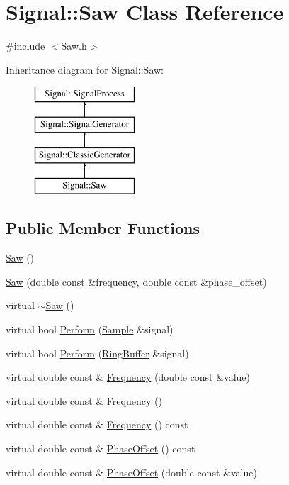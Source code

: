 \hypertarget{class_signal_1_1_saw}{\section{Signal\+:\+:Saw Class Reference}
\label{class_signal_1_1_saw}
}


{\ttfamily \#include $<$Saw.\+h$>$}

Inheritance diagram for Signal\+:\+:Saw\+:\begin{figure}[H]
\begin{center}
\leavevmode
\includegraphics[height=4.000000cm]{class_signal_1_1_saw}
\end{center}
\end{figure}
\subsection*{Public Member Functions}
\begin{DoxyCompactItemize}
\item 
\hyperlink{class_signal_1_1_saw_a4bce6f687d2bd26aa3c2fb209de4c9f9}{Saw} ()
\item 
\hyperlink{class_signal_1_1_saw_a6d772ec845a8c98a4111a7bf1ddabb10}{Saw} (double const \&frequency, double const \&phase\+\_\+offset)
\item 
virtual \hyperlink{class_signal_1_1_saw_a1663e993e22dd1f66033c4de1c1007e9}{$\sim$\+Saw} ()
\item 
virtual bool \hyperlink{class_signal_1_1_saw_a6fb3216b94fea4daa83b27f5de194fa0}{Perform} (\hyperlink{class_signal_1_1_sample}{Sample} \&signal)
\item 
virtual bool \hyperlink{class_signal_1_1_saw_a0d0d374c9b5a3f73f48e9fb1c444b0ca}{Perform} (\hyperlink{class_signal_1_1_ring_buffer}{Ring\+Buffer} \&signal)
\item 
virtual double const \& \hyperlink{class_signal_1_1_saw_af91fd0d15b380c02e309705eaad46efd}{Frequency} (double const \&value)
\item 
virtual double const \& \hyperlink{class_signal_1_1_saw_acf3fd0346394d9fd2690bb5fee9550f6}{Frequency} ()
\item 
virtual double const \& \hyperlink{class_signal_1_1_signal_generator_a96af42ee68f94e9b04d034fd68b73ecd}{Frequency} () const 
\item 
virtual double const \& \hyperlink{class_signal_1_1_signal_generator_ac2538ec946f001e394d2416fda698d1c}{Phase\+Offset} () const 
\item 
virtual double const \& \hyperlink{class_signal_1_1_signal_generator_ac6a103ff72beaa338f6d18c812522d78}{Phase\+Offset} (double const \&value)
\end{DoxyCompactItemize}
